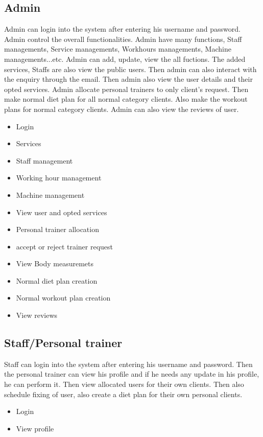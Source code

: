 \documentclass[a4paper,12pt,toc=flat]{report}
\begin{document}
{	\subsection{Admin}
	Admin can login into the system after entering his username and password. Admin control the overall functionalities. Admin have many functions, Staff managements, Service managements, Workhours managements, Machine managements...etc. Admin can add, update, view the all fuctions. The added services, Staffs are also view the public users. Then admin can also interact with the enquiry through the email. Then admin also view the user details and their opted services. Admin allocate personal trainers to only client’s request. Then make normal diet plan for all normal category clients. Also make the workout plans for normal category clients. Admin can also view the reviews of user.
	
	\begin{itemize}
		\item  Login
		\item Services
		\item	Staff management 
		\item	Working hour management
			\item Machine management
		\item	View user and opted services
		\item	Personal trainer allocation
		\item   accept or reject trainer request
		\item	View Body measuremets
		\item	Normal diet plan creation
		\item	Normal workout plan creation
		\item	View reviews
		
		
		
		
		
	\end{itemize}
	
	
	\subsection{Staff/Personal trainer}
	Staff can login into the system after entering his username and password. Then the personal trainer can view his profile and if he needs any update in his profile, he can perform it. Then view allocated users for their own clients. Then also schedule
	fixing of user, also create a diet plan for their own personal clients.
	
	\begin{itemize}
		\item  Login
		\item	View profile
	

\end{itemize}}
\end{document}
